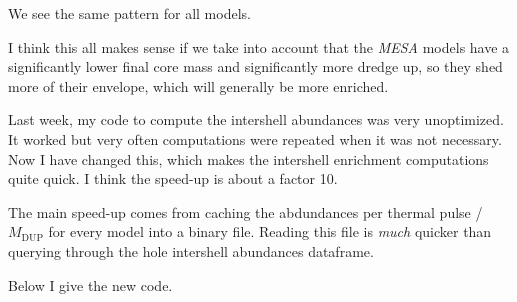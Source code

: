 \documentclass[a4paper,10pt]{article}
\begin{document}
We see the same pattern for all models.

I think this all makes sense if we take into account that the \emph{MESA} models have a significantly lower final core mass and significantly more dredge up, so they shed more of their envelope, which will generally be more enriched.



\appendix


Last week, my code to compute the intershell abundances was very unoptimized. It worked but very often computations were repeated when it was not necessary.
Now I have changed this, which makes the intershell enrichment computations quite quick. I think the speed-up is about a factor 10.

The main speed-up comes from caching the abdundances per thermal pulse / \(M_\text{DUP}\) for every model into a binary file. Reading this file is \emph{much} quicker than querying through the hole intershell abundances dataframe.

Below I give the new code.
\end{document}
